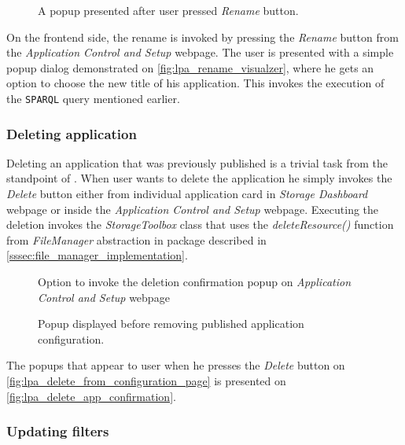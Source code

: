 \begin{figure}[h]
\centering
{}
\caption{A popup presented after user pressed \textit{Rename} button.}
\label{fig:lpa_rename_visualzer}
\end{figure}

On the frontend side, the rename is invoked by pressing the \textit{Rename} button from the \textit{Application Control and Setup} webpage. The user is presented with a simple popup dialog demonstrated on \autoref{fig:lpa_rename_visualzer}, where he gets an option to choose the new title of his application. This invokes the execution of the \texttt{SPARQL} query mentioned earlier.

\subsubsection{Deleting application}

Deleting an application that was previously published is a trivial task from the standpoint of \lpas{}. When user wants to delete the application he simply invokes the \textit{Delete} button either from individual application card in \textit{Storage Dashboard} webpage or inside the \textit{Application Control and Setup} webpage. Executing the deletion invokes the \textit{StorageToolbox} class that uses the \textit{deleteResource()} function from \textit{FileManager} abstraction in \lpas{} package described in \autoref{sssec:file_manager_implementation}.

\begin{figure}[hbt]
  \caption{Option to invoke the deletion confirmation popup on \textit{Application Control and Setup} webpage}
  \label{fig:lpa_delete_from_configuration_page}
\endminipage\hfill
{}
  \caption{Popup displayed before removing published application configuration.}
  \label{fig:lpa_delete_app_confirmation}
\endminipage\hfill
\end{figure}

The popups that appear to user when he presses the \textit{Delete} button on \autoref{fig:lpa_delete_from_configuration_page} is presented on \autoref{fig:lpa_delete_app_confirmation}.

\subsubsection{Updating filters}
\label{ssssec:updating_filters_implementation}

